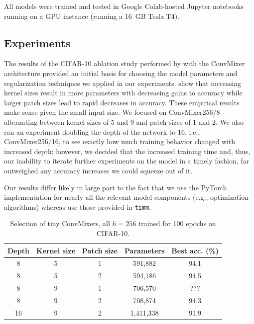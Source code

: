 \documentclass[letterpaper]{article} %
\begin{document}
All models were trained and tested in Google Colab-hosted Jupyter notebooks running on a GPU instance (running a 16 GB Tesla T4).

\subsection{Experiments}

The results of the CIFAR-10 ablation study performed by \citet{trockman2022patches} with the ConvMixer architecture provided an initial basis for choosing the model parameters and regularization techniques we applied in our experiments. \citet{trockman2022patches} show that increasing kernel sizes result in more parameters with decreasing gains to accuracy while larger patch sizes lead to rapid decreases in accuracy. These empirical results make sense given the small input size. We focused on ConvMixer256/8 alternating between kernel sizes of 5 and 9 and patch sizes of 1 and 2. We also ran an experiment doubling the depth of the network to 16, i.e., ConvMixer256/16, to see exactly how much training behavior changed with increased depth; however, we decided that the increased training time and, thus, our inability to iterate further experiments on the model in a timely fashion, far outweighed any accuracy increases we could squeeze out of it.

Our results differ likely in large part to the fact that we use the PyTorch implementation for nearly all the relevant model components (e.g., optimization algorithms) whereas \citet{trockman2022patches} use those provided in \verb|timm|.

\begin{table}
    \begin{tabular}{|c|c|c|c|c|}
        \hline
        \hline 
        Depth & Kernel size & Patch size & Parameters & Best acc. (\%) \\
        \hline
        8 & 5 & 1 & 591,882 & 94.1 \\
        8 & 5 & 2 & 594,186 & 94.5 \\
        8 & 9 & 1 & 706,570 & ??? \\
        8 & 9 & 2 & 708,874 & 94.3 \\
        16 & 9 & 2 & 1,411,338 & 91.9 \\
        \hline
    \end{tabular}
    \caption{Selection of tiny ConvMixers, all $h=256$ trained for 100 epochs on CIFAR-10.}
\end{table}
\end{document}
